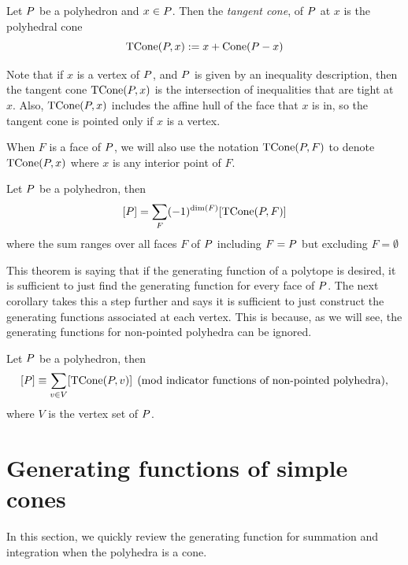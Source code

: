 \begin{definition} 
Let ${ P}$ be a polyhedron and $x \in { P}$. Then the \emph{tangent cone}, of ${ P}$ at $x$ is the polyhedral cone 
\[\operatorname{TCone}({ P}, x) := x + \operatorname{Cone}({ P} - x)\]  
\end{definition} 
 
Note that if $x$ is a vertex of ${ P}$, and ${ P}$ is given by an inequality description, then the tangent cone $\operatorname{TCone}({ P}, x)$ is the intersection of inequalities that are tight at $x$. Also, $\operatorname{TCone}({ P}, x)$ includes the affine hull of the face that $x$ is in, so the tangent cone is pointed only if $x$ is a vertex. 

When $F$ is a face of ${ P}$, we will also use the notation $\operatorname{TCone}({ P}, F)$ to denote $\operatorname{TCone}({ P}, x)$ where $x$ is any interior point of $F$.

\begin{theorem}
Let ${ P}$ be a polyhedron, then 
\[[{ P}] = \sum_{F} (-1)^{\dim(F)}[\operatorname{TCone}({ P}, F)] \]
where the sum ranges over all faces $F$ of ${ P}$ including $F = { P}$ but excluding $F = \emptyset$
\end{theorem} 

This theorem is saying that if the generating function of a polytope is desired, it is sufficient to just find the generating function for every face of ${ P}$. The next
 corollary takes this a step further and says it is sufficient to just construct the generating functions associated at each vertex. This is because, as we will see, the generating functions for non-pointed polyhedra can be ignored.
 
\begin{cor}
\label{cor:tcone-mod-lines}
Let ${ P}$ be a polyhedron, then 
\[ [{ P}] \equiv \sum_{v \in V} [\operatorname{TCone}({ P}, v)] \pmod{\text{indicator functions of non-pointed polyhedra}},\]
where $V$ is the vertex set of ${ P}$.
\end{cor}

\section{Generating functions of simple cones}

In this section, we quickly review the generating function for summation and integration when the polyhedra is a cone. 


